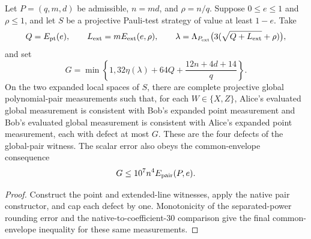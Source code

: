 \begin{theorem}
\label{thm:qld-native-small-regime-global-pair}
\leanok
{}
Let $P=(q,m,d)$ be admissible, $n=md$, and $\rho=n/q$.  Suppose
$0\leq e\leq1$ and $\rho\leq1$, and let $S$ be a projective Pauli-test
strategy of value at least $1-e$.  Take
\[
 Q=E_{\rm pt}(e),\qquad
 L_{\rm ext}=mE_{\rm ext}(e,\rho),\qquad
 \lambda=\Lambda_{P_{\rm ext}}
   \bigl(3(\sqrt{Q+L_{\rm ext}}+\rho)\bigr),
\]
and set
\[
 G=\min\!\left\{1,
 32\eta(\lambda)+64Q+\frac{12n+4d+14}{q}\right\}.
\]
On the two expanded local spaces of $S$, there are complete projective global
polynomial-pair measurements such that, for each $W\in\{X,Z\}$, Alice's
evaluated global measurement is consistent with Bob's expanded point
measurement and Bob's evaluated global measurement is consistent with Alice's
expanded point measurement, each with defect at most $G$.  These are the four
defects of the global-pair witness.  The scalar error also obeys the
common-envelope consequence
\[
 G\leq10^7n^4E_{\rm pair}(P,e).
\]
\end{theorem}
\begin{proof}
\leanok
{}
Construct the point and extended-line witnesses, apply the native pair
constructor, and cap each defect by one.  Monotonicity of the separated-power
rounding error and the native-to-coefficient-$30$ comparison give the final
common-envelope inequality for these same measurements.
\end{proof}

